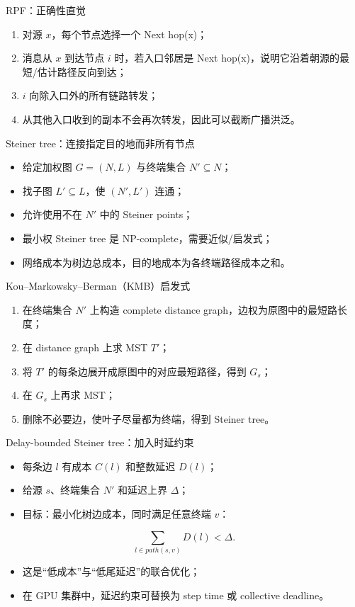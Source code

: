 \documentclass[UTF8,fontset=none,aspectratio=169,10pt]{beamer}
\begin{document}
{\begin{frame}{RPF：正确性直觉}
\begin{enumerate}
  \item 对源 $x$，每个节点选择一个 Next hop(x)；
  \item 消息从 $x$ 到达节点 $i$ 时，若入口邻居是 Next hop(x)，说明它沿着朝源的最短/估计路径反向到达；
  \item $i$ 向除入口外的所有链路转发；
  \item 从其他入口收到的副本不会再次转发，因此可以截断广播洪泛。
\end{enumerate}
\vfill
{}
\end{frame}

\begin{frame}{Steiner tree：连接指定目的地而非所有节点}
\begin{itemize}
  \item 给定加权图 $G=(N,L)$ 与终端集合 $N'\subseteq N$；
  \item 找子图 $L'\subseteq L$，使 $(N',L')$ 连通；
  \item 允许使用不在 $N'$ 中的 Steiner points；
  \item 最小权 Steiner tree 是 NP-complete，需要近似/启发式；
  \item 网络成本为树边总成本，目的地成本为各终端路径成本之和。
\end{itemize}
\end{frame}

\begin{frame}{Kou--Markowsky--Berman（KMB）启发式}
\scriptsize
\begin{enumerate}
  \item 在终端集合 $N'$ 上构造 complete distance graph，边权为原图中的最短路长度；
  \item 在 distance graph 上求 MST $T'$；
  \item 将 $T'$ 的每条边展开成原图中的对应最短路径，得到 $G_s$；
  \item 在 $G_s$ 上再求 MST；
  \item 删除不必要边，使叶子尽量都为终端，得到 Steiner tree。
\end{enumerate}
\normalsize
\vfill
{}
\end{frame}

\begin{frame}{Delay-bounded Steiner tree：加入时延约束}
\begin{itemize}
  \item 每条边 $l$ 有成本 $C(l)$ 和整数延迟 $D(l)$；
  \item 给源 $s$、终端集合 $N'$ 和延迟上界 $\Delta$；
  \item 目标：最小化树边成本，同时满足任意终端 $v$：
\end{itemize}
\[
\sum_{l\in path(s,v)}D(l)<\Delta.
\]
\begin{itemize}
  \item 这是“低成本”与“低尾延迟”的联合优化；
  \item 在 GPU 集群中，延迟约束可替换为 step time 或 collective deadline。
\end{itemize}
\end{frame}

}
\end{document}
